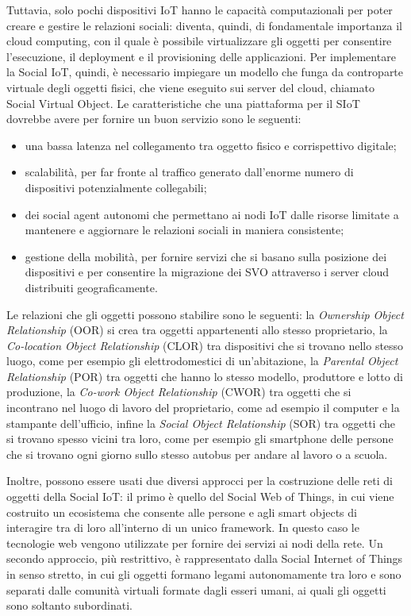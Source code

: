 Tuttavia, solo pochi dispositivi IoT hanno le capacità computazionali per poter creare e gestire le relazioni sociali: diventa, quindi, di fondamentale importanza il cloud computing, con il quale è possibile virtualizzare gli oggetti per consentire l'esecuzione, il deployment e il provisioning delle applicazioni. Per implementare la Social IoT, quindi, è necessario impiegare un modello che funga da controparte virtuale degli oggetti fisici, che viene eseguito sui server del cloud, chiamato Social Virtual Object. Le caratteristiche che una piattaforma per il SIoT dovrebbe avere per fornire un buon servizio sono le seguenti:
\begin{itemize}
\item una bassa latenza nel collegamento tra oggetto fisico e corrispettivo digitale;
\item scalabilità, per far fronte al traffico generato dall'enorme numero di dispositivi potenzialmente collegabili;
\item dei social agent autonomi che permettano ai nodi IoT dalle risorse limitate a mantenere e aggiornare le relazioni sociali in maniera consistente;
\item gestione della mobilità, per fornire servizi che si basano sulla posizione dei dispositivi e per consentire la migrazione dei SVO attraverso i server cloud distribuiti geograficamente.
\end{itemize}

Le relazioni che gli oggetti possono stabilire sono le seguenti: la \textit{Ownership Object Relationship} (OOR) si crea tra oggetti appartenenti allo stesso proprietario, la \textit{Co-location Object Relationship} (CLOR) tra dispositivi che si trovano nello stesso luogo, come per esempio gli elettrodomestici di un'abitazione, la \textit{Parental Object Relationship} (POR) tra oggetti che hanno lo stesso modello, produttore e lotto di produzione, la \textit{Co-work Object Relationship} (CWOR) tra oggetti che si incontrano nel luogo di lavoro del proprietario, come ad esempio il computer e la stampante dell'ufficio, infine la \textit{Social Object Relationship} (SOR) tra oggetti che si trovano spesso vicini tra loro, come per esempio gli smartphone delle persone che si trovano ogni giorno sullo stesso autobus per andare al lavoro o a scuola.

Inoltre, possono essere usati due diversi approcci per la costruzione delle reti di oggetti della Social IoT: il primo è quello del Social Web of Things, in cui viene costruito un ecosistema che consente alle persone e agli smart objects di interagire tra di loro all'interno di un unico framework. In questo caso le tecnologie web vengono utilizzate per fornire dei servizi ai nodi della rete. Un secondo approccio, più restrittivo, è rappresentato dalla Social Internet of Things in senso stretto, in cui gli oggetti formano legami autonomamente tra loro e sono separati dalle comunità virtuali formate dagli esseri umani, ai quali gli oggetti sono soltanto subordinati.

